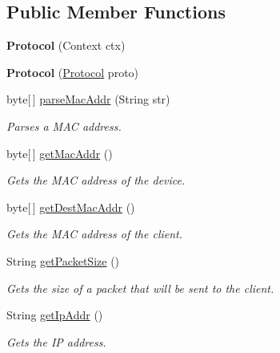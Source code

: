 \subsection*{Public Member Functions}
\begin{DoxyCompactItemize}
\item 
\hypertarget{classcom_1_1client_1_1mobii_1_1protocol_1_1_protocol_a96cfed44b06eb58384bea71e90943f77}{{\bfseries Protocol} (Context ctx)}\label{classcom_1_1client_1_1mobii_1_1protocol_1_1_protocol_a96cfed44b06eb58384bea71e90943f77}

\item 
\hypertarget{classcom_1_1client_1_1mobii_1_1protocol_1_1_protocol_a8e7244ea62c19985a93ca7ac61b60ec1}{{\bfseries Protocol} (\hyperlink{classcom_1_1client_1_1mobii_1_1protocol_1_1_protocol}{Protocol} proto)}\label{classcom_1_1client_1_1mobii_1_1protocol_1_1_protocol_a8e7244ea62c19985a93ca7ac61b60ec1}

\item 
byte\mbox{[}$\,$\mbox{]} \hyperlink{classcom_1_1client_1_1mobii_1_1protocol_1_1_protocol_afbf74b9dd1379e440d96db7ac7be9e48}{parse\-Mac\-Addr} (String str)
\begin{DoxyCompactList}\small\item\em Parses a M\-A\-C address. \end{DoxyCompactList}\item 
byte\mbox{[}$\,$\mbox{]} \hyperlink{classcom_1_1client_1_1mobii_1_1protocol_1_1_protocol_ad464a8c55028dfe2ac29bd8815dc81ff}{get\-Mac\-Addr} ()
\begin{DoxyCompactList}\small\item\em Gets the M\-A\-C address of the device. \end{DoxyCompactList}\item 
byte\mbox{[}$\,$\mbox{]} \hyperlink{classcom_1_1client_1_1mobii_1_1protocol_1_1_protocol_a6c9bbc2923092cf4f7793069486a2654}{get\-Dest\-Mac\-Addr} ()
\begin{DoxyCompactList}\small\item\em Gets the M\-A\-C address of the client. \end{DoxyCompactList}\item 
String \hyperlink{classcom_1_1client_1_1mobii_1_1protocol_1_1_protocol_a70377ced7149feb5626a13e7fb509af6}{get\-Packet\-Size} ()
\begin{DoxyCompactList}\small\item\em Gets the size of a packet that will be sent to the client. \end{DoxyCompactList}\item 
String \hyperlink{classcom_1_1client_1_1mobii_1_1protocol_1_1_protocol_afb79e304a0665b762bff6fd452c0928e}{get\-Ip\-Addr} ()
\begin{DoxyCompactList}\small\item\em Gets the I\-P address. \end{DoxyCompactList}\end{DoxyCompactItemize}
